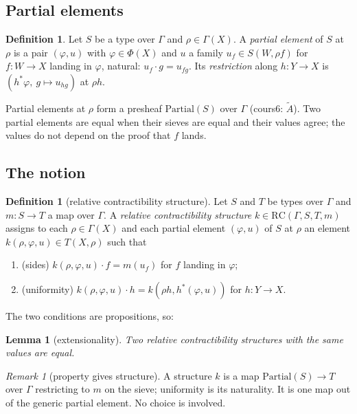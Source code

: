 \documentclass[11pt]{article}
\newcommand{\RC}{\mathrm{RC}}
\newcommand{\Partial}{\mathrm{Partial}}
\theoremstyle{plain}
\newtheorem{lemma}[theorem]{Lemma}
\theoremstyle{definition}
\newtheorem{definition}[theorem]{Definition}
\theoremstyle{remark}
\newtheorem{remark}[theorem]{Remark}
\begin{document}
\subsection{Partial elements}

\begin{definition}
Let $S$ be a type over $\Gamma$ and $\rho\in\Gamma(X)$. A \emph{partial
element} of $S$ at $\rho$ is a pair $(\varphi,u)$ with $\varphi\in\Phi(X)$
and $u$ a family $u_f\in S(W,\rho f)$ for $f:W\to X$ landing in
$\varphi$, natural: $u_f\cdot g=u_{fg}$. Its \emph{restriction} along
$h:Y\to X$ is $(h^*\varphi,\ g\mapsto u_{hg})$ at $\rho h$.
\end{definition}

Partial elements at $\rho$ form a presheaf $\Partial(S)$ over $\Gamma$
(cours6: $\tilde A$). Two partial elements are equal when their sieves
are equal and their values agree; the values do not depend on the proof
that $f$ lands.

\subsection{The notion}

\begin{definition}[relative contractibility structure]\label{def:rc}
Let $S$ and $T$ be types over $\Gamma$ and $m:S\to T$ a map over
$\Gamma$. A \emph{relative contractibility structure} $k\in\RC(\Gamma,S,T,m)$
assigns to each $\rho\in\Gamma(X)$ and each partial element $(\varphi,u)$
of $S$ at $\rho$ an element $k(\rho,\varphi,u)\in T(X,\rho)$ such that
\begin{enumerate}
\item (sides) $k(\rho,\varphi,u)\cdot f=m(u_f)$ for $f$ landing in
  $\varphi$;
\item (uniformity) $k(\rho,\varphi,u)\cdot h=k(\rho h,h^*(\varphi,u))$
  for $h:Y\to X$.
\end{enumerate}
\end{definition}

The two conditions are propositions, so:

\begin{lemma}[extensionality]\label{lem:rc-ext}
Two relative contractibility structures with the same values are equal.
\end{lemma}

\begin{remark}[property gives structure]
A structure $k$ is a map $\Partial(S)\to T$ over $\Gamma$ restricting to
$m$ on the sieve; uniformity is its naturality. It is one map out of the
generic partial element. No choice is involved.
\end{remark}
\end{document}
